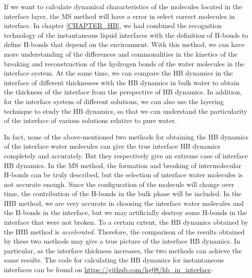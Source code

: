If we want to calculate dynamical characteristics of the molecules located in the interface layer, 
the MS method will have a error in select correct molecules in interface. 
In chapter \ref{CHAPTER_HB}, we had combined the recognition technology of the instantaneous liquid interfaces \cite{Willard2010} 
with the definition of H-bonds \cite{AL96b,Luzar1996} to define H-bonds that depend on the environment. 
With this method, we can have more understanding of the differences and commonalities in the kinetics of the breaking and reconstruction of the hydrogen bonds 
of the water molecules in the interface system. At the same time, we can compare the HB dynamics in the interface of different thicknesses 
with the HB dynamics in bulk water to obtain the thickness of the interface from the perspective of HB dynamics. 
In addition, for the interface system of different solutions, we can also use the layering technique to study the HB dynamics,
so that we can understand the particularity of the interface of various solutions relative to pure water. 

In fact, none of the above-mentioned two methods for obtaining the HB dynamics of the interface water molecules 
can give the true interface HB dynamics completely and accurately. But they respectively give an extreme case of interface HB dynamics. 
In the MS method, the formation and breaking of intermolecular H-bonds can be truly described, 
but the selection of interface water molecules is not accurate enough. Since the configuration of the molecule will change over time, 
the contribution of the H-bonds in the bulk phase will be included. 
In the IHB method, we are very accurate in choosing the interface water molecules and the H-bonds in the interface, 
but we may artificially destroy some H-bonds in the interface that were not broken. 
To a certain extent, the HB dynamics obtained by the IHB method is \emph{accelerated}. 
Therefore, the comparison of the results obtained by these two methods may give a true picture of the interface HB dynamics.
In particular, as the interface thickness increases, the two methods can achieve the same results.
The code for calculating the HB dynamics for instantaneous interfaces can be found on \url{https://github.com/hg08/hb_in_interface}. 
